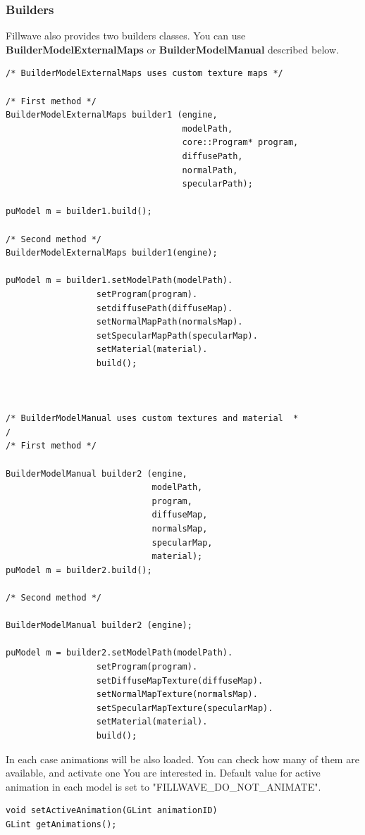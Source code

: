 \documentclass{article}
\begin{document}
\subsubsection{Builders}\label{sec:builderCreation}
\indent \indent Fillwave also provides two builders classes. You can use \textbf{BuilderModelExternalMaps} or \textbf{BuilderModelManual} described below.
\begin{lstlisting}
/* BuilderModelExternalMaps uses custom texture maps */

/* First method */
BuilderModelExternalMaps builder1 (engine,
                                   modelPath,
                                   core::Program* program,
                                   diffusePath,
                                   normalPath,
                                   specularPath);

puModel m = builder1.build();

/* Second method */
BuilderModelExternalMaps builder1(engine);

puModel m = builder1.setModelPath(modelPath).
                  setProgram(program).
                  setdiffusePath(diffuseMap).
                  setNormalMapPath(normalsMap).
                  setSpecularMapPath(specularMap).
                  setMaterial(material).
                  build();



/* BuilderModelManual uses custom textures and material  *
/
/* First method */

BuilderModelManual builder2 (engine,
                             modelPath,
                             program,
                             diffuseMap,
                             normalsMap,
                             specularMap,
                             material);
puModel m = builder2.build();

/* Second method */

BuilderModelManual builder2 (engine);

puModel m = builder2.setModelPath(modelPath).
                  setProgram(program).
                  setDiffuseMapTexture(diffuseMap).
                  setNormalMapTexture(normalsMap).
                  setSpecularMapTexture(specularMap).
                  setMaterial(material).
                  build();

\end{lstlisting}

\indent In each case animations will be also loaded. You can check how many of them are available, and activate one You are interested in. Default value for active animation in each model is set to "FILLWAVE\_DO\_NOT\_ANIMATE".
\begin{lstlisting}
void setActiveAnimation(GLint animationID)
GLint getAnimations();
\end{lstlisting}
\end{document}
